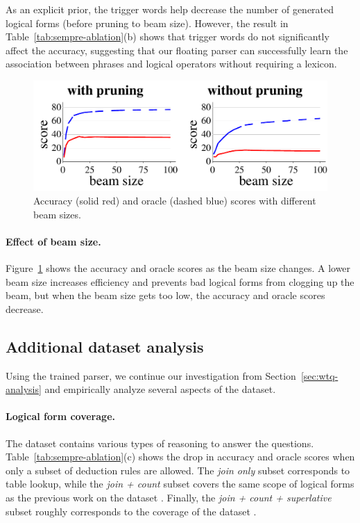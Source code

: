 As an explicit prior,
the trigger words help decrease the number of
generated logical forms
(before pruning to beam size).
However, the result in Table~\ref{tab:sempre-ablation}(b)
shows that trigger words
do not significantly affect the accuracy,
suggesting that our floating parser
can successfully learn the association
between phrases and logical operators
without requiring a lexicon.

\begin{figure}[t]
\centering
\includegraphics[scale=0.5]{sfig/sempre.slides/newBeamPlot.pdf}
\caption{
Accuracy (solid red) and oracle (dashed blue) scores with different beam sizes.
}
\label{fig:sempre-beam}
\end{figure}

\paragraph{Effect of beam size.}
Figure~\ref{fig:sempre-beam}
shows the accuracy and oracle scores
as the beam size changes.
A lower beam size increases efficiency
and prevents bad logical forms from clogging up the beam,
but when the beam size gets too low,
the accuracy and oracle scores decrease.

\subsection{Additional dataset analysis}
\label{sec:wtq-analysis-again}

Using the trained parser,
we continue our investigation from
Section~\ref{sec:wtq-analysis}
and empirically analyze several aspects of the
\wtq dataset.

\paragraph{Logical form coverage.}
The \wtq dataset contains various types of reasoning
to answer the questions.
Table~\ref{tab:sempre-ablation}(c) shows the drop in accuracy
and oracle scores
when only a subset of deduction rules are allowed.
The \emph{join only} subset corresponds to table lookup,
while the \emph{join + count} subset covers the same scope
of logical forms as the previous work on the  dataset
\cite{berant2013freebase}.
Finally, the \emph{join + count + superlative} subset
roughly corresponds to the coverage of the  dataset \cite{zelle96geoquery}.

